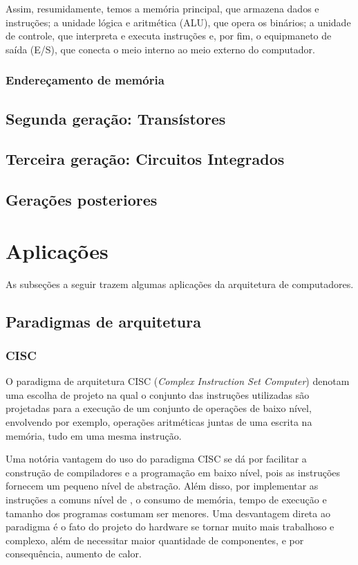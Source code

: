 \documentclass{article}
\begin{document}
Assim, resumidamente, temos a memória principal, que armazena dados e
instruções; a unidade lógica e aritmética (ALU), que opera os binários; a
unidade de controle, que interpreta e executa instruções e, por fim, o
equipmaneto de saída (E/S), que conecta o meio interno ao meio externo do
computador.

\subsubsection{Endereçamento de memória}

\subsection{Segunda geração: Transístores}
\subsection{Terceira geração: Circuitos Integrados}
\subsection{Gerações posteriores}

\section{Aplicações} 
As subseções a seguir trazem algumas aplicações da arquitetura de computadores.
\subsection{Paradigmas de arquitetura}

\subsubsection{CISC}
O paradigma de arquitetura CISC (\textit{Complex Instruction Set Computer})
denotam uma escolha de projeto na qual o conjunto das instruções utilizadas são
projetadas para a execução de um conjunto de operações de baixo nível,
envolvendo por exemplo, operações aritméticas juntas de uma escrita na memória,
tudo em uma mesma instrução.

Uma notória vantagem do uso do paradigma CISC se dá por facilitar a construção
de compiladores e a programação em baixo nível, pois as instruções fornecem um
pequeno nível de abstração. Além disso, por implementar as instruções a comuns
nível de , o consumo de memória, tempo de execução e tamanho
dos programas costumam ser menores. Uma desvantagem direta ao paradigma é o
fato do projeto do hardware se tornar muito mais trabalhoso e complexo, além de
necessitar maior quantidade de componentes, e por consequência, aumento de
calor.
\end{document}
